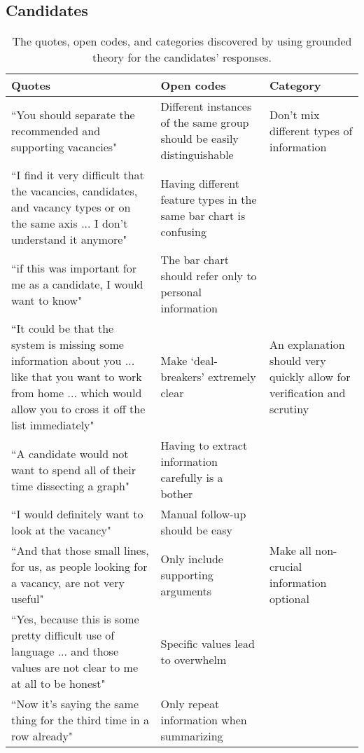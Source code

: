 \subsection{Candidates}
\begin{table*}[]
\captionsetup{width=1.5\textwidth}
\footnotesize
\begin{adjustwidth}{-2.5in}{-2.5in}
\centering
\begin{tabularx}{1.5\textwidth}{@{}X>{\raggedright\arraybackslash}p{6.5cm}>{\raggedright\arraybackslash}p{3.5cm}@{}}
\toprule
\textbf{Quotes} &
  \textbf{Open codes} &
  \textbf{Category} \\ \midrule
``You should separate the recommended and supporting vacancies" &
  Different instances of the same group should be easily distinguishable &
  Don't mix different types of information \\ \cmidrule(r){1-1}
``I find it very difficult that the vacancies, candidates, and vacancy types or on the same axis ... I don't understand it anymore" &
  Having different feature types in the same bar chart is confusing &
   \\ \cmidrule(r){1-1}
``if this was important for me as a candidate, I would want to know" &
  The bar chart should refer only to personal information &
   \\ \midrule
``It could be that the system is missing some information about you ... like that you want to work from home ... which would allow you to cross it off the list immediately" &
  Make `deal-breakers' extremely clear &
  An explanation should very quickly allow for verification and scrutiny \\ \cmidrule(r){1-1}
``A candidate would not want to spend all of their time dissecting a graph" &
  Having to extract information carefully is a bother &
   \\ \cmidrule(r){1-1}
``I would definitely want to look at the vacancy" &
  Manual follow-up should be easy &
   \\ \midrule
``And that those small lines, for us, as people looking for a vacancy, are not very useful" &
  Only include supporting arguments &
  Make all non-crucial information optional \\ \cmidrule(r){1-1}
``Yes, because this is some pretty difficult use of language ... and those values are not clear to me at all to be honest" &
  Specific values lead to overwhelm &
   \\ \cmidrule(r){1-1}
``Now it's saying the same thing for the third time in a row already" &
  Only repeat information when summarizing &
   \\ \bottomrule

\end{tabularx}
\end{adjustwidth}
\caption{The quotes, open codes, and categories discovered by using grounded theory for the candidates' responses.}
\label{tab:candidates_GT}
\end{table*}

